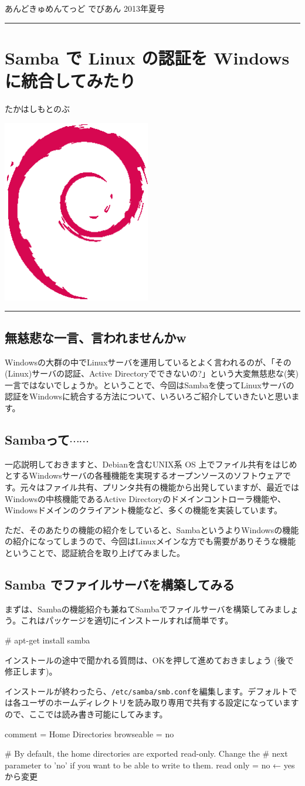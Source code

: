 \documentclass[mingoth,a4paper]{jsarticle}
\renewcommand{\dancersection}[2]{%
\newpage
あんどきゅめんてっど でびあん 2013年夏号
%
\vspace{0.1mm}\\
{\color{dancerdarkblue}\rule{\hsize}{2mm}}

%
%
\begin{minipage}[t]{0.6\hsize}
\color{dancerdarkblue}
\vspace{1cm}
\section{#1}
\hfill{}#2\\
\end{minipage}
\begin{minipage}[t]{0.4\hsize}
\vspace{-2cm}
\hfill{}\includegraphics[height=8cm]{image200502/openlogo-nd.eps}\\
\vspace{-5cm}
\end{minipage}
%
{\color{dancerlightblue}\rule{0.66\hsize}{2mm}}
%
\vspace{2cm}
}
\begin{document}
\dancersection{Samba で Linux の認証を Windows に統合してみたり}{たかはしもとのぶ}

\subsection{無慈悲な一言、言われませんかw}
Windowsの大群の中でLinuxサーバを運用しているとよく言われるのが、「その(Linux)サーバの認証、Active Directoryでできないの?」という大変無慈悲な(笑)一言ではないでしょうか。ということで、今回はSambaを使ってLinuxサーバの認証をWindowsに統合する方法について、いろいろご紹介していきたいと思います。

\subsection{Sambaって$\cdots \cdots$}
一応説明しておきますと、Debianを含むUNIX系 OS 上でファイル共有をはじめとするWindowsサーバの各種機能を実現するオープンソースのソフトウェアです。元々はファイル共有、プリンタ共有の機能から出発していますが、最近ではWindowsの中核機能であるActive Directoryのドメインコントローラ機能や、Windowsドメインのクライアント機能など、多くの機能を実装しています。

ただ、そのあたりの機能の紹介をしていると、SambaというよりWindowsの機能の紹介になってしまうので、今回はLinuxメインな方でも需要がありそうな機能ということで、認証統合を取り上げてみました。

\subsection{Samba でファイルサーバを構築してみる}

まずは、Sambaの機能紹介も兼ねてSambaでファイルサーバを構築してみましょう。これはパッケージを適切にインストールすれば簡単です。

\begin{commandline}
# apt-get install samba
\end{commandline}

インストールの途中で聞かれる質問は、OKを押して進めておきましょう (後で修正します)。

インストールが終わったら、{\tt{/etc/samba/smb.conf}}を編集します。デフォルトでは各ユーザのホームディレクトリを読み取り専用で共有する設定になっていますので、ここでは読み書き可能にしてみます。

\begin{commandline}
[homes]
   comment = Home Directories
   browseable = no

# By default, the home directories are exported read-only. Change the
# next parameter to 'no' if you want to be able to write to them.
   read only = no ← yesから変更
\end{commandline}
\end{document}
